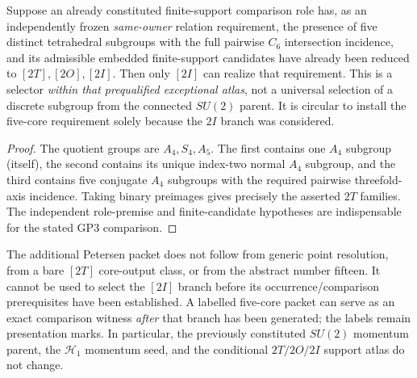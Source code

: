 \documentclass[12pt,a4paper]{article}
\begin{document}
\begin{corollary}
\label{p2a:cor:v318-five-core-exceptional-test}
Suppose an already constituted finite-support comparison role has, as
an independently frozen \emph{same-owner} relation requirement, the
presence of five distinct tetrahedral subgroups with the full
pairwise $C_6$ intersection incidence, and its admissible embedded
finite-support candidates have already been reduced to
$[2T],[2O],[2I]$.  Then only $[2I]$ can realize that requirement.
This is a selector \emph{within that prequalified exceptional atlas},
not a universal selection of a discrete subgroup from the connected
$SU(2)$ parent.  It is circular to install the five-core requirement
solely because the $2I$ branch was considered.
\end{corollary}
\begin{proof}
The quotient groups are $A_4,S_4,A_5$.  The first contains one
$A_4$ subgroup (itself), the second contains its unique index-two
normal $A_4$ subgroup, and the third contains five conjugate $A_4$
subgroups with the required pairwise threefold-axis incidence.
Taking binary preimages gives precisely the asserted $2T$ families.
The independent role-premise and finite-candidate hypotheses are
indispensable for the stated GP3 comparison.
\end{proof}

\begin{proposition}
\label{p2a:prop:v318-petersen-nonconverse}
The additional Petersen packet does not follow from generic point
resolution, from a bare $[2T]$ core-output class, or from the abstract
number fifteen.  It cannot be used to select the $[2I]$ branch before
its occurrence/comparison prerequisites have been established.
A labelled five-core packet can serve as an exact comparison witness
\emph{after} that branch has been generated; the labels remain
presentation marks.  In particular, the previously constituted
$SU(2)$ momentum parent, the $\mathcal H_1$ momentum seed, and the
conditional $2T/2O/2I$ support atlas do not change.
\end{proposition}
\end{document}
